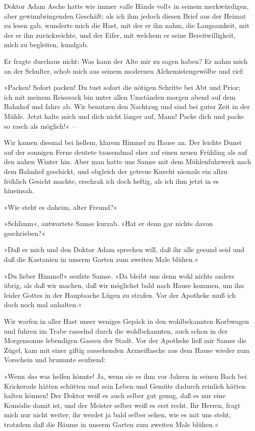 Doktor Adam Asche hatte wie immer »alle Hände voll« in seinem
merkwürdigen, aber gewinnbringenden Geschäft; als ich ihm jedoch
diesen Brief aus der Heimat zu lesen gab, wunderte mich die Hast,
mit der er ihn nahm, die Langsamkeit, mit der er ihn zurückreichte,
und der Eifer, mit welchem er seine Bereitwilligkeit, mich zu
begleiten, kundgab.

Er fragte durchaus nicht: Was kann der Alte mir zu sagen haben? Er
nahm mich an der Schulter, schob mich aus seinem modernen
Alchemistengewölbe und rief:

»Packen! Sofort packen! Du tust sofort die nötigen Schritte bei Abt
und Prior; ich mit meinem Reisesack bin unter allen Umständen
morgen abend auf dem Bahnhof und fahre ab. Wir benutzen den
Nachtzug und sind bei guter Zeit in der Mühle. Jetzt halte mich und
dich nicht länger auf, Mann! Packe dich und packe so rasch als
möglich!«~–

Wir kamen diesmal bei hellem, klarem Himmel zu Hause an. Der
leichte Dunst auf der sonnigen Ferne deutete tausendmal eher auf
einen neuen Frühling als auf den nahen Winter hin. Aber man hatte
uns Samse mit dem Mühlenfuhrwerk nach dem Bahnhof geschickt, und
obgleich der getreue Knecht niemals ein allzu fröhlich Gesicht
machte, erschrak ich doch heftig, als ich ihm jetzt in es
hineinsah.

»Wie steht es daheim, alter Freund?«

»Schlimm«, antwortete Samse kurzab. »Hat er denn gar nichts davon
geschrieben?«

»Daß er mich und den Doktor Adam sprechen will, daß ihr alle gesund
seid und daß die Kastanien in unserm Garten zum zweiten Male
blühen.«

»Du lieber Himmel!« seufzte Samse. »Da bleibt uns denn wohl nichts
anders übrig, als daß wir machen, daß wir möglichst bald nach Hause
kommen, um ihn leider Gottes in der Hauptsache Lügen zu strafen.
Vor der Apotheke muß ich doch noch mal anhalten.«

Wir warfen in aller Hast unser weniges Gepäck in den wohlbekannten
Korbwagen und fuhren im Trabe rasselnd durch die wohlbekannten,
auch schon in der Morgensonne lebendigen Gassen der Stadt. Vor der
Apotheke ließ mir Samse die Zügel, kam mit einer giftig aussehenden
Arzneiflasche aus dem Hause wieder zum Vorschein und brummte
seufzend:

»Wenn \emph{das} was helfen könnte! Ja, wenn sie es ihm vor Jahren
in seinen Bach bei Krickerode hätten schütten und sein Leben und
Gemüte dadurch reinlich hätten halten können! Der Doktor weiß es
auch selber gut genug, daß es nur eine Komödie damit ist, und der
Meister selber weiß es erst recht. Ihr Herren, fragt mich nur nicht
weiter; ihr werdet ja bald selber sehen, wie es mit uns steht,
trotzdem daß die Bäume in unserm Garten zum zweiten Male blühen.«

